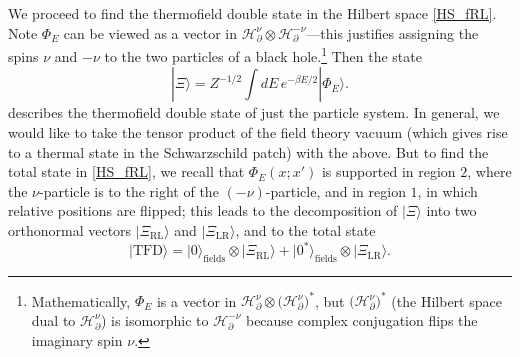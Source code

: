 \documentclass[11pt]{article}
\newcommand*{\ket}[1]{|{#1}\rangle}
\newcommand{\calH}{\mathcal{H}}
\newcommand{\la}{\text{L}}
\newcommand{\ra}{\text{R}}
\newcommand{\TFD}{\mathrm{TFD}}
\newcommand{\p}{\partial}
\begin{document}
We proceed to find the thermofield double state in the Hilbert space \eqref{HS_fRL}. Note $\Phi_E$ can be viewed as a vector in $\calH^{\nu}_{\p} \otimes \calH^{-\nu}_{\p}$---this justifies assigning the spins $\nu$ and $-\nu$ to the two particles of a black hole.\footnote{Mathematically, $\Phi_E$ is a vector in $\calH^{\nu}_{\p}\otimes\bigl(\calH^{\nu}_{\p}\bigr)^*$, but $\bigl(\calH^{\nu}_{\p}\bigr)^*$ (the Hilbert space dual to $\calH^{\nu}_{\p}$) is isomorphic to  $\calH^{-\nu}_{\p}$ because complex conjugation flips the imaginary spin $\nu$.} Then the state
\begin{equation}\label{Xi}
\ket{\Xi}=Z^{-1/2}\int dE \,e^{-\beta E/2} \ket{\Phi_E}.
\end{equation}
describes the thermofield double state of just the particle system. In general, we would like to take the tensor product of the field theory vacuum (which gives rise to a thermal state in the Schwarzschild patch) with the above. But to find the total state in \eqref{HS_fRL}, we recall that $\Phi_E(x;x')$ is supported in region $2$, where the $\nu$-particle is to the right of the $(-\nu)$-particle, and in region $1$, in which relative positions are flipped; this leads to the decomposition of $\ket{\Xi}$ into two orthonormal vectors $\ket{\Xi_{\ra\la}}$ and $\ket{\Xi_{\la\ra}}$, and to the total state 
\begin{equation}\label{TFD}
\ket{\TFD}=\ket{0}_{\text{fields}}\otimes\ket{\Xi_{\ra\la}}
+\ket{0^*}_{\text{fields}}\otimes\ket{\Xi_{\la\ra}}.
\end{equation}
\end{document}

